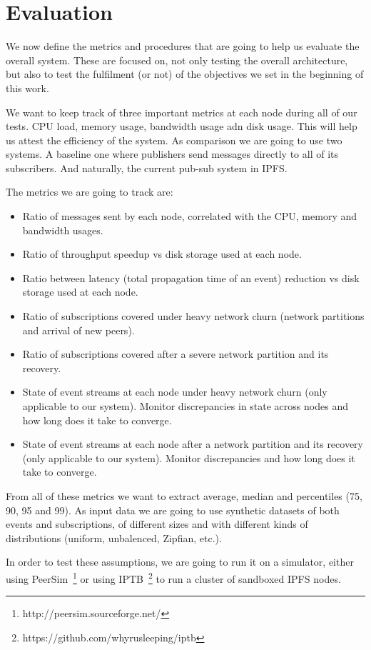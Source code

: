 
%
%

\section{Evaluation}

We now define the metrics and procedures that are going to help us evaluate the overall system. These are focused on, not only
testing the overall architecture, but also to test the fulfilment (or not) of the objectives we set in the beginning of this
work.

We want to keep track of three important metrics at each node during all of our tests. CPU load, memory usage, bandwidth usage adn disk usage. This will help us attest the efficiency of the system. As comparison we are going to use two systems. A baseline one where publishers send messages directly to all of its subscribers. And naturally, the current pub-sub system in IPFS.

The metrics we are going to track are:

\begin{itemize}
  \item Ratio of messages sent by each node, correlated with the CPU, memory and bandwidth usages.
  \item Ratio of throughput speedup vs disk storage used at each node.
  \item Ratio between latency (total propagation time of an event) reduction vs disk storage used at each node.
  \item Ratio of subscriptions covered under heavy network churn (network partitions and arrival of new peers).
  \item Ratio of subscriptions covered after a severe network partition and its recovery.
  \item State of event streams at each node under heavy network churn (only applicable to our system). Monitor discrepancies in state across nodes and how long does it take to converge.
  \item State of event streams at each node after a network partition and its recovery (only applicable to our system). Monitor discrepancies and how long does it take to converge.
\end{itemize}

From all of these metrics we want to extract average, median and percentiles (75, 90, 95 and 99). As input data we are going to use synthetic datasets of both events and subscriptions, of different sizes and with different kinds of distributions (uniform, unbalenced, Zipfian, etc.).

In order to test these assumptions, we are going to run it on a simulator, either using PeerSim~\footnote{http://peersim.sourceforge.net/} or using IPTB~\footnote{https://github.com/whyrusleeping/iptb} to run a cluster of sandboxed IPFS nodes.

